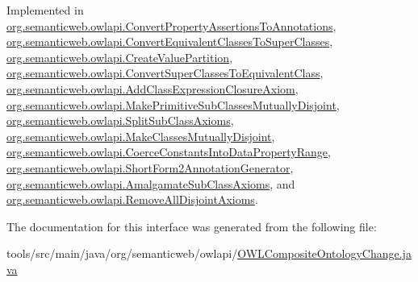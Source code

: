 Implemented in \hyperlink{classorg_1_1semanticweb_1_1owlapi_1_1_convert_property_assertions_to_annotations_a2d1657f0011363abe9f6ffa22ec3e485}{org.\-semanticweb.\-owlapi.\-Convert\-Property\-Assertions\-To\-Annotations}, \hyperlink{classorg_1_1semanticweb_1_1owlapi_1_1_convert_equivalent_classes_to_super_classes_a9651ac0c0e2e5d1a433b807b365ef818}{org.\-semanticweb.\-owlapi.\-Convert\-Equivalent\-Classes\-To\-Super\-Classes}, \hyperlink{classorg_1_1semanticweb_1_1owlapi_1_1_create_value_partition_a24ca66232bcb652688f8e438e74718f2}{org.\-semanticweb.\-owlapi.\-Create\-Value\-Partition}, \hyperlink{classorg_1_1semanticweb_1_1owlapi_1_1_convert_super_classes_to_equivalent_class_a5260eaab593e9e995a5ab0fe98d87de4}{org.\-semanticweb.\-owlapi.\-Convert\-Super\-Classes\-To\-Equivalent\-Class}, \hyperlink{classorg_1_1semanticweb_1_1owlapi_1_1_add_class_expression_closure_axiom_a2a4996e325158effda63902111d88846}{org.\-semanticweb.\-owlapi.\-Add\-Class\-Expression\-Closure\-Axiom}, \hyperlink{classorg_1_1semanticweb_1_1owlapi_1_1_make_primitive_sub_classes_mutually_disjoint_ad787b56afd51518a10dfa26585e33c7d}{org.\-semanticweb.\-owlapi.\-Make\-Primitive\-Sub\-Classes\-Mutually\-Disjoint}, \hyperlink{classorg_1_1semanticweb_1_1owlapi_1_1_split_sub_class_axioms_a879dbd2b8f3dd35dff635097abb051ae}{org.\-semanticweb.\-owlapi.\-Split\-Sub\-Class\-Axioms}, \hyperlink{classorg_1_1semanticweb_1_1owlapi_1_1_make_classes_mutually_disjoint_a05a24609c583b67f973c10bf0d3d2d24}{org.\-semanticweb.\-owlapi.\-Make\-Classes\-Mutually\-Disjoint}, \hyperlink{classorg_1_1semanticweb_1_1owlapi_1_1_coerce_constants_into_data_property_range_ab1e563bd192619dbf7848b001eafa9f7}{org.\-semanticweb.\-owlapi.\-Coerce\-Constants\-Into\-Data\-Property\-Range}, \hyperlink{classorg_1_1semanticweb_1_1owlapi_1_1_short_form2_annotation_generator_a0351d911c4b0ce73d1d40149e437fdbe}{org.\-semanticweb.\-owlapi.\-Short\-Form2\-Annotation\-Generator}, \hyperlink{classorg_1_1semanticweb_1_1owlapi_1_1_amalgamate_sub_class_axioms_a5bd7f6c22488f7377c9819dbe6bba199}{org.\-semanticweb.\-owlapi.\-Amalgamate\-Sub\-Class\-Axioms}, and \hyperlink{classorg_1_1semanticweb_1_1owlapi_1_1_remove_all_disjoint_axioms_a12626e589fe15228f8232d9a1c232f6d}{org.\-semanticweb.\-owlapi.\-Remove\-All\-Disjoint\-Axioms}.



The documentation for this interface was generated from the following file\-:\begin{DoxyCompactItemize}
\item 
tools/src/main/java/org/semanticweb/owlapi/\hyperlink{_o_w_l_composite_ontology_change_8java}{O\-W\-L\-Composite\-Ontology\-Change.\-java}\end{DoxyCompactItemize}
